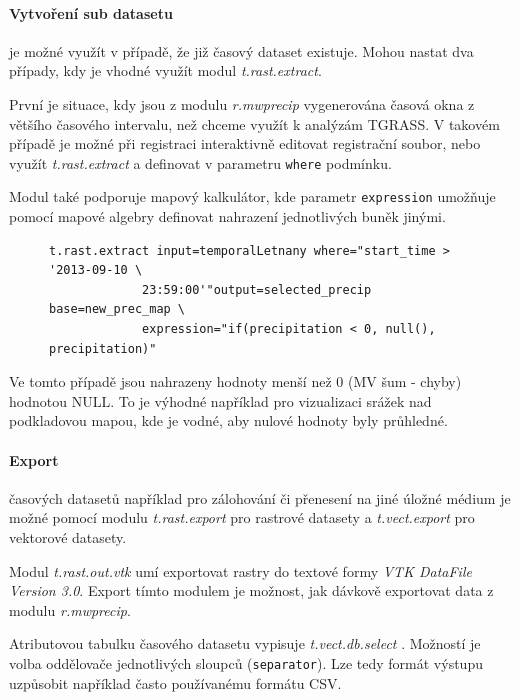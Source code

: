 \documentclass[a4paper,12pt,oneside]{report}
\begin{document}
\paragraph*{Vytvoření sub datasetu} je možné využít v případě, že již
časový dataset existuje. Mohou nastat dva případy, kdy je vhodné
využít modul \textit{t.rast.extract}.

První je situace, kdy jsou z modulu \textit{r.mwprecip} vygenerována
časová okna z většího časového intervalu, než chceme využít k analýzám
TGRASS. V takovém případě je možné při registraci interaktivně
editovat registrační soubor, nebo využít \textit{t.rast.extract} a
definovat v parametru \texttt{where} podmínku.

Modul také podporuje mapový kalkulátor, kde parametr
\texttt{expression} umožňuje pomocí mapové algebry definovat nahrazení
jednotlivých buněk jinými.
\begin{figure}[h!]
\begin{footnotesize}
\lstset{extendedchars=false,
escapeinside=''}
\begin{lstlisting}[style=mybash]
t.rast.extract input=temporalLetnany where="start_time > '2013-09-10 \
             23:59:00'"output=selected_precip base=new_prec_map \
             expression="if(precipitation < 0, null(), precipitation)" 
\end{lstlisting}
\end{footnotesize} 
\end{figure}

Ve tomto případě jsou nahrazeny hodnoty menší než 0 (MV šum - chyby)
hodnotou NULL. To je výhodné například pro vizualizaci srážek nad
podkladovou mapou, kde je vodné, aby nulové hodnoty byly průhledné.

\paragraph*{ Export} časových datasetů například pro zálohování či
přenesení na jiné úložné médium je možné pomocí modulu
\textit{t.rast.export} pro rastrové datasety a \textit{t.vect.export}
pro vektorové datasety.

Modul \textit{t.rast.out.vtk} umí exportovat rastry do textové formy
\textit{VTK DataFile Version 3.0}. Export tímto modulem je možnost,
jak dávkově exportovat data z modulu \textit{r.mwprecip}.

Atributovou tabulku časového datasetu vypisuje \textit{
  t.vect.db.select }. Možností je volba oddělovače jednotlivých
sloupců (\texttt{separator}). Lze tedy formát výstupu uzpůsobit
například často používanému formátu CSV.
\end{document}
